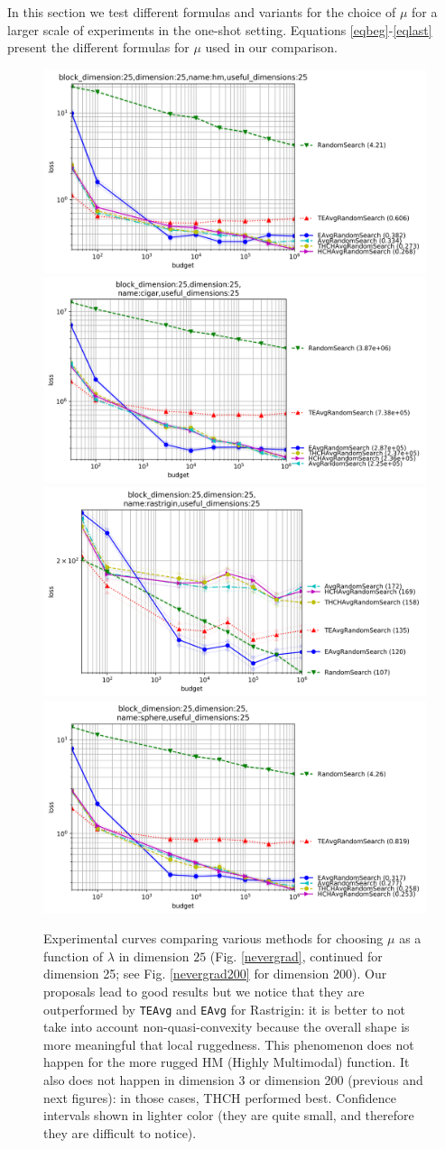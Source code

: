 In this section we test different formulas and variants for the choice of $\mu$ for a larger scale of experiments in the one-shot setting. Equations \ref{eqbeg}-\ref{eqlast} present the different formulas for $\mu$ used in our comparison.
\begin{figure}[t]
\centering
\includegraphics[trim={0 0 0 0}, clip, width=.48\textwidth]{sections/appendix/ppsn2020-kbest/imgs/hugewidedoenonw/xpresults_block_dimension25,dimension25,namehm,useful_dimensions25.png}
\includegraphics[trim={0 0 0 20}, clip, width=.48\textwidth]{sections/appendix/ppsn2020-kbest/imgs/hugewidedoenonw/xpresults_block_dimension25,dimension25,namecigar,useful_dimensions25.png}
\includegraphics[trim={0 0 0 20}, clip, width=.48\textwidth]{sections/appendix/ppsn2020-kbest/imgs/hugewidedoenonw/xpresults_block_dimension25,dimension25,namerastrigin,useful_dimensions25.png}
\includegraphics[trim={0 0 0 20}, clip, width=.48\textwidth]{sections/appendix/ppsn2020-kbest/imgs/hugewidedoenonw/xpresults_block_dimension25,dimension25,namesphere,useful_dimensions25.png}\caption{\label{nevergrad25}Experimental curves comparing various methods for choosing $\mu$ as a function of $\lambda$ in dimension $25$ (Fig. \ref{nevergrad}, continued for dimension 25; see Fig. \ref{nevergrad200} for dimension $200$). Our proposals lead to good results but we notice that they are outperformed by \texttt{TEAvg} and \texttt{EAvg} for Rastrigin: it is better to not take into account non-quasi-convexity because the overall shape is more meaningful that local ruggedness. This phenomenon does not happen for the more rugged HM (Highly Multimodal) function. It also does not happen in dimension 3 or dimension 200 (previous and next figures): in those cases, THCH performed best. Confidence intervals shown in lighter color (they are quite small, and therefore they are difficult to notice).}

\end{figure}
